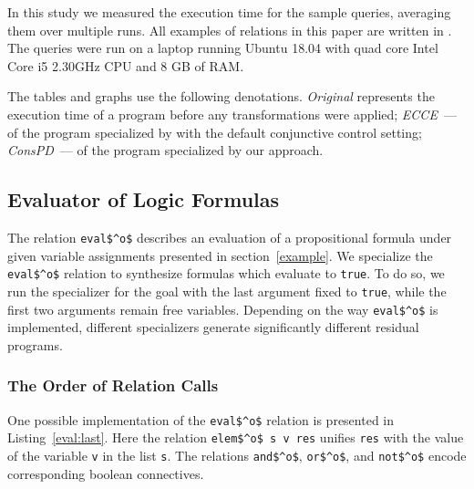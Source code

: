 In this study we measured the execution time for the sample queries, averaging them over multiple runs.
All examples of \mk relations in this paper are written in \oc.
The queries were run on a laptop running Ubuntu 18.04 with quad core Intel Core i5 2.30GHz CPU and 8 GB of RAM.

The tables and graphs use the following denotations.
\emph{Original} represents the execution time of a program before any transformations were applied; \emph{ECCE}~--- of the program specialized by \ecce with the default conjunctive control setting; \emph{ConsPD}~--- of the program specialized by our approach.

\subsection{Evaluator of Logic Formulas}

The relation \lstinline{eval$^o$} describes an evaluation of a propositional formula under given variable assignments presented in section~\ref{example}.
We specialize the \lstinline{eval$^o$} relation to synthesize formulas which evaluate to \lstinline{true}.
To do so, we run the specializer for the goal with the last argument fixed to \lstinline{true}, while the first two arguments remain free variables.
Depending on the way \lstinline{eval$^o$} is implemented, different specializers generate significantly different residual programs.

\subsubsection{The Order of Relation Calls}

One possible implementation of the \lstinline{eval$^o$} relation is presented in Listing~\ref{eval:last}.
Here the relation \lstinline{elem$^o$ s v res} unifies \lstinline{res} with the value of the variable \lstinline{v} in the list \lstinline{s}.
The relations \lstinline{and$^o$}, \lstinline{or$^o$}, and \lstinline{not$^o$} encode corresponding boolean connectives.

